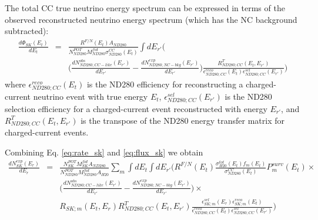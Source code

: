 The total CC true neutrino energy spectrum can be expressed in terms
of the observed
reconstructed neutrino energy spectrum (which has the NC background subtracted):
{
\arraycolsep=2pt
\begin{equation}
\displaystyle
\begin{array}{lcl}
  \frac{d\Phi_{SK}(E_{t})}{dE_{t}} & = & 
  \frac{R^{F/N}(E_{t}) A_{ND280}}{N_{ND280}^{POT} M_{ND280}^{fid} \sigma^{CC}_{ND280}(E_{t})}
  {\displaystyle \int dE_{r\prime}} \Bigg( \\ & &
    \Big(
      \frac{dN_{ND280;CC-like}^{obs}(E_{r\prime})}{dE_{r\prime}} - 
      \frac{dN_{ND280;NC-bkg}^{exp}(E_{r\prime})}{dE_{r\prime}}
    \Big)  
    \frac{R^{T}_{ND280;CC}(E_{t},E_{r\prime})}
         {\epsilon^{reco}_{ND280;CC}(E_{t}) \epsilon^{sel}_{ND280;CC}(E_{r\prime})}
  \Bigg)
\end{array}
\label{eq:flux_sk}
\end{equation}
}
where
$\epsilon^{reco}_{ND280;CC}(E_{t})$ is the ND280 efficiency for reconstructing a charged-current neutrino event with true energy $E_{t}$,
$\epsilon^{sel}_{ND280;CC}(E_{r\prime})$ is the ND280 selection efficiency for a charged-current event reconstructed with energy $E_{r\prime}$, and
$R^{T}_{ND280;CC}(E_{t},E_{r\prime})$ is the transpose of the ND280 energy transfer matrix for charged-current events.

Combining Eq. \ref{eq:rate_sk} and \ref{eq:flux_sk} we obtain
{
\arraycolsep=2pt
\begin{equation}
\displaystyle
\begin{array}{lcl}
  \frac{dN_{SK}^{exp}(E_{r})}{dE_{r}} & = & 
  \frac{N_{SK}^{POT} M_{SK}^{fid} A_{ND280}}{N_{ND280}^{POT} M_{ND280}^{fid} A_{H20}} 
  {\displaystyle \sum_{m} \int dE_{t} \int dE_{r\prime}} \Bigg( 
  R^{F/N}(E_{t})
  \frac{\sigma_{H20}^{tot}(E_{t}) f_{m}(E_{t})}{\sigma^{CC}_{ND280}(E_{t})}
  P_{m}^{surv}(E_{t}) \times \\ & &
  \Big(\frac{dN_{ND280;CC-like}^{obs}(E_{r\prime})}{dE_{r\prime}} - 
       \frac{dN_{ND280;NC-bkg}^{exp}(E_{r\prime})}{dE_{r\prime}}\Big)  \times \\ & &
    R_{SK;m}(E_{t},E_{r}) R^{T}_{ND280;CC}(E_{t},E_{r\prime}) 
    \frac{\epsilon^{sel}_{SK;m}(E_{r}) \epsilon^{reco}_{SK;m}(E_{t})}
         {\epsilon^{reco}_{ND280;CC}(E_{t}) \epsilon^{sel}_{ND280;CC}(E_{r\prime})} 
    \Bigg)
\end{array}
\label{eq:far_prediction}
\end{equation}%
}

%
%


